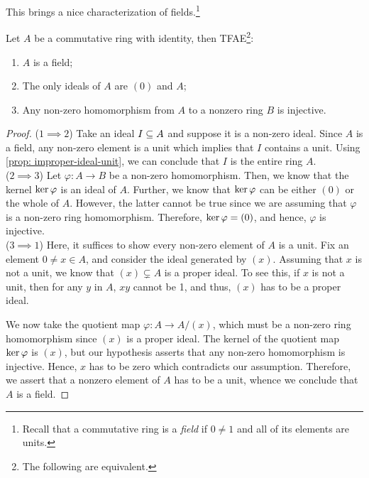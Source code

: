 This brings a nice characterization of fields.\footnote{Recall that a commutative ring is a {\it field} if $0\neq 1$ and all of its elements are units.}
\begin{proposition}\label{prop: char-field}
    Let $A$ be a commutative ring with identity, then TFAE\footnote{The following are equivalent.}:
    \begin{enumerate}
        \item $A$ is a field;
        \item The only ideals of $A$ are $(0)$ and $A$;
        \item Any non-zero homomorphism from $A$ to a nonzero ring $B$ is injective.
    \end{enumerate}
\end{proposition} 
\begin{proof}
    ($1 \implies 2$) Take an ideal $I \ss A$ and suppose it is a non-zero ideal. Since $A$ is a field, any non-zero element is a unit which implies that $I$ contains a unit. Using \cref{prop: improper-ideal-unit}, we can conclude that $I$ is the entire ring $A$.\\
    
    ($2 \implies 3$) Let $\varphi: A \rightarrow B$ be a non-zero homomorphism. Then, we know that the kernel $\Ker{\varphi}$ is an ideal of $A$. Further, we know that $\Ker{\varphi}$ can be either $(0)$ or the whole of $A$. However, the latter cannot be true since we are assuming that $\varphi$ is a non-zero ring homomorphism. Therefore, $\Ker{\varphi} =(0)$, and hence, $\varphi$ is injective.\\
    
    ($3 \implies 1$) Here, it suffices to show  every non-zero element of $A$ is a unit. Fix an element $0 \neq x \in A$, and consider the ideal generated by $(x)$. Assuming that $x$ is not a unit, we know that $(x) \subsetneq A$ is a proper ideal. To see this, if $x$ is not a unit, then for any $y$ in $A$, $x y$ cannot be 1, and thus, $(x)$ has to be a proper ideal.
    
    We now take the quotient map $\varphi: A \rightarrow A /(x)$, which must be a non-zero ring homomorphism since $(x)$ is a proper ideal. The kernel of the quotient map $\Ker{\varphi}$ is $(x)$, but our hypothesis asserts that any non-zero homomorphism is injective. Hence, $x$ has to be zero which contradicts our assumption. Therefore, we assert that a nonzero element of $A$ has to be a unit, whence we conclude that $A$ is a field.
\end{proof}

